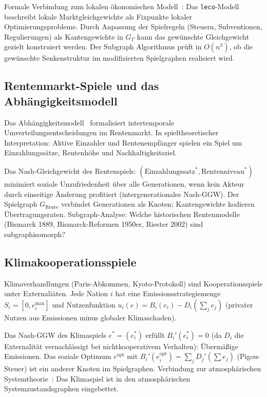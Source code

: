 ﻿\documentclass[a4paper,12pt]{article}
\theoremstyle{definition}
\begin{document}
Formale Verbindung zum lokalen \"okonomischen Modell~\cite{epp2026leco}:
Das \texttt{leco}-Modell beschreibt lokale Marktgleichgewichte als Fixpunkte
lokaler Optimierungsprobleme. Durch Anpassung der Spielregeln (Steuern,
Subventionen, Regulierungen) als Kantengewichte in $G_\Gamma$ kann das
gew\"unschte Gleichgewicht gezielt konstruiert werden.
Der Subgraph Algorithmus pr\"uft in $O(n^3)$, ob die gew\"unschte
Senkenstruktur im modifizierten Spielgraphen realisiert wird.

\subsection{Rentenmarkt-Spiele und das Abh\"angigkeitsmodell}

Das Abh\"angigkeitsmodell~\cite{epp2026depension} formalisiert intertemporale
Umverteilungsentscheidungen im Rentenmarkt.
In spieltheoretischer Interpretation: Aktive Einzahler und Rentenempf\"anger
spielen ein Spiel um Einzahlungss\"atze, Rentenh\"ohe und Nachhaltigkeitsziel.

Das Nash-Gleichgewicht des Rentenspiels:
$(\text{Einzahlungssatz}^*, \text{Rentenniveau}^*)$ minimiert
soziale Unzufriedenheit \"uber alle Generationen, wenn kein Akteur durch
einseitige \"Anderung profitiert (intergenerationales Nash-GGW).
Der Spielgraph $G_{\mathrm{Rente}}$ verbindet Generationen als Knoten;
Kantengewichte kodieren \"Ubertragungsraten.
Subgraph-Analyse: Welche historischen Rentenmodelle (Bismarck 1889,
Bismarck-Reformen 1950er, Riester 2002) sind subgraphisomorph?

\subsection{Klimakooperationsspiele}

Klimaverhandlungen (Paris-Abkommen, Kyoto-Protokoll) sind Kooperationsspiele
unter Externali\"aten. Jede Nation $i$ hat eine Emissionsstrategiemenge
$S_i = [0, e_i^{\max}]$ und Nutzenfunktion
$u_i(e) = B_i(e_i) - D_i(\sum_j e_j)$
(privater Nutzen aus Emissionen minus globaler Klimaschaden).

Das Nash-GGW des Klimaspiels $e^* = (e_i^*)$ erf\"ullt
$B_i'(e_i^*) = 0$ (da $D_i$ die Externalit\"at vernachl\"assigt bei
nichtkooperativem Verhalten): \"Uberm\"a{\ss}ige Emissionen.
Das soziale Optimum $e^{\mathrm{opt}}$ mit
$B_i'(e_i^{\mathrm{opt}}) = \sum_j D_j'(\sum e_j)$ (Pigou-Steuer)
ist ein anderer Knoten im Spielgraphen.
Verbindung zur atmosph\"arischen Systemtheorie~\cite{epp2026klima}:
Das Klimaspiel ist in den atmosph\"arischen Systemzustandsgraphen eingebettet.
\end{document}
